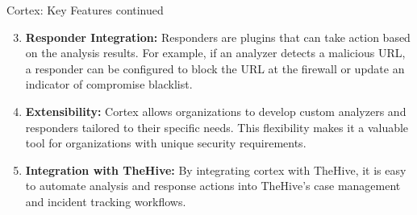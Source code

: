 \begin{frame}{Cortex: Key Features continued}
    
\begin{enumerate}
 \setcounter{enumi}{2}

    \item \begin{justify}
        \textbf{Responder Integration:} Responders are plugins that can take action based on the analysis results. For example, if an analyzer detects a malicious URL, a responder can be configured to block the URL at the firewall or update an indicator of compromise blacklist.
    \end{justify}
    \item \begin{justify}
        \textbf{Extensibility:} Cortex allows organizations to develop custom analyzers and responders tailored to their specific needs. This flexibility makes it a valuable tool for organizations with unique security requirements.
    \end{justify}
    \item \begin{justify}
        \textbf{Integration with TheHive:} By integrating cortex with TheHive, it is easy to automate analysis and response actions into TheHive's case management and incident tracking workflows.
    \end{justify}
    
\end{enumerate}
\end{frame}

